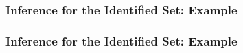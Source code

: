 \documentclass[10pt,letterpaper]{beamer}
\begin{document}
\begin{frame}
\frametitle{Inference for the Identified Set: Example}

\begin{figure}[h!]
\begin{center}
\end{center}
\end{figure}	
\end{frame}
\begin{frame}
\frametitle{Inference for the Identified Set: Example}

\begin{figure}[h!]
\begin{center}
\end{center}
\end{figure}	
\end{frame}
\end{document}
